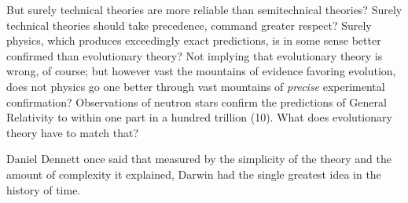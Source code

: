 {
 But surely technical theories are more reliable than semitechnical
theories? Surely technical theories should take precedence, command
greater respect? Surely physics, which produces exceedingly exact
predictions, is in some sense better confirmed than evolutionary
theory? Not implying that evolutionary theory is wrong, of course; but
however vast the mountains of evidence favoring evolution, does not
physics go one better through vast mountains of \textit{precise}
experimental confirmation? Observations of neutron stars confirm the
predictions of General Relativity to within one part in a hundred
trillion (10). What does evolutionary theory have
to match that?}

{
 Daniel Dennett once said that measured by the simplicity of the
theory and the amount of complexity it explained, Darwin had the single
greatest idea in the history of time.}

